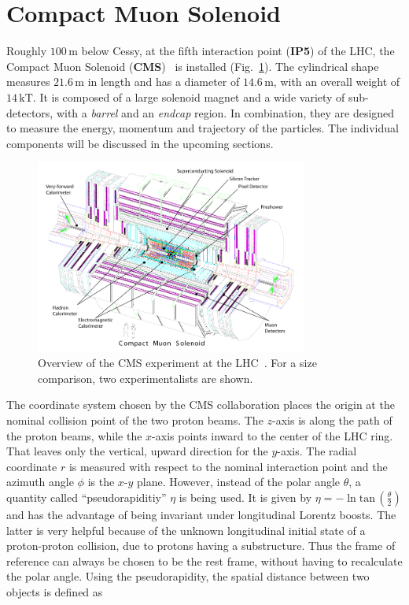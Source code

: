 \section{Compact Muon Solenoid}
\label{sec:cms}

Roughly $100\,\text{m}$ below Cessy, at the fifth interaction point (\textbf{IP5}) of the LHC, the Compact Muon Solenoid (\textbf{CMS})~\cite{cmsjinst} is installed (Fig.~\ref{fig:cms}). The cylindrical shape measures $21.6\,\text{m}$ in length and has a diameter of $14.6\,\text{m}$, with an overall weight of $14\,\text{kT}$. It is composed of a large solenoid magnet and a wide variety of sub-detectors, with a \textit{barrel} and an \textit{endcap} region. In combination, they are designed to measure the energy, momentum and trajectory of the particles. The individual components will be discussed in the upcoming sections.

\begin{figure}[ht!]
  \centering
  \includegraphics[width=0.8\textwidth]{plots/cms.pdf}
  \caption{Overview of the CMS experiment at the LHC~\cite{cmsjinst}. For a size comparison, two experimentalists are shown.}
  \label{fig:cms}
\end{figure}

The coordinate system chosen by the CMS collaboration places the origin at the nominal collision point of the two proton beams. The $z$-axis is along the path of the proton beams, while the $x$-axis points inward to the center of the LHC ring. That leaves only the vertical, upward direction for the $y$-axis. The radial coordinate $r$ is measured with respect to the nominal interaction point and the azimuth angle $\phi$ is the $x$-$y$ plane. However, instead of the polar angle $\theta$, a quantity called ``pseudorapiditiy'' $\eta$ is being used. It is given by $\eta = - \ln{\text{tan}\,\left(\frac{\theta}{2}\right)}$ and has the advantage of being invariant under longitudinal Lorentz boosts. The latter is very helpful because of the unknown longitudinal initial state of a proton-proton collision, due to protons having a substructure. Thus the frame of reference can always be chosen to be the rest frame, without having to recalculate the polar angle. Using the pseudorapidity, the spatial distance between two objects is defined as

